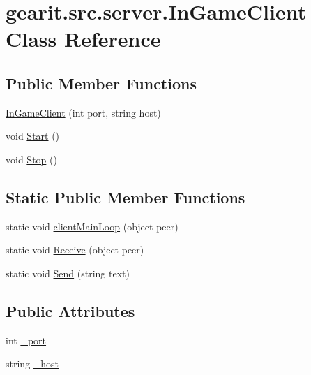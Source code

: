 \hypertarget{classgearit_1_1src_1_1server_1_1_in_game_client}{\section{gearit.\+src.\+server.\+In\+Game\+Client Class Reference}
\label{classgearit_1_1src_1_1server_1_1_in_game_client}
}
\subsection*{Public Member Functions}
\begin{DoxyCompactItemize}
\item 
\hyperlink{classgearit_1_1src_1_1server_1_1_in_game_client_ac3d84371a93b83ed0f725017a360ef4b}{In\+Game\+Client} (int port, string host)
\item 
void \hyperlink{classgearit_1_1src_1_1server_1_1_in_game_client_abf9b01661389d167e851a2528515f825}{Start} ()
\item 
void \hyperlink{classgearit_1_1src_1_1server_1_1_in_game_client_aba2fbf057dad6fcc8cbe1c72c0bc4704}{Stop} ()
\end{DoxyCompactItemize}
\subsection*{Static Public Member Functions}
\begin{DoxyCompactItemize}
\item 
static void \hyperlink{classgearit_1_1src_1_1server_1_1_in_game_client_a0a84d45621b0d116d3fea6b94d8fa762}{client\+Main\+Loop} (object peer)
\item 
static void \hyperlink{classgearit_1_1src_1_1server_1_1_in_game_client_a4b510a499fb80bede88e7cfb39c1bbd8}{Receive} (object peer)
\item 
static void \hyperlink{classgearit_1_1src_1_1server_1_1_in_game_client_a121b9e3a59651c8811980bb4934e5c76}{Send} (string text)
\end{DoxyCompactItemize}
\subsection*{Public Attributes}
\begin{DoxyCompactItemize}
\item 
int \hyperlink{classgearit_1_1src_1_1server_1_1_in_game_client_a6022cf3bf1d5301a88de25e52bd04f90}{\+\_\+port}
\item 
string \hyperlink{classgearit_1_1src_1_1server_1_1_in_game_client_a2267fff8d06afc2cc38335d10f7d9492}{\+\_\+host}
\end{DoxyCompactItemize}


